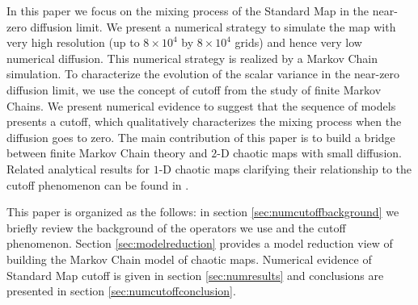   

In this paper we focus on the mixing process of the Standard Map in
the near-zero diffusion limit. We present a numerical strategy to
simulate the map with very high resolution (up to $8 \times 10^4$ by
$8 \times 10^4$ grids) and hence very low numerical diffusion. This
numerical strategy is realized by a Markov Chain simulation. To
characterize the evolution of the scalar variance in the near-zero
diffusion limit, we use the concept of cutoff from the study of finite
Markov Chains. We present numerical evidence to suggest that the
sequence of models presents a cutoff, which qualitatively
characterizes the mixing process when the diffusion goes to zero. The
main contribution of this paper is to build a bridge between finite
Markov Chain theory and $2$-D chaotic maps with small
diffusion. Related analytical results for $1$-D chaotic maps
clarifying their relationship to the cutoff phenomenon can be found in
\cite{symdyn}.

This paper is organized as the follows: in section
\ref{sec:numcutoffbackground} we briefly review the background of the
operators we use and the cutoff phenomenon. Section
\ref{sec:modelreduction} provides a model reduction view of building
the Markov Chain model of chaotic maps. Numerical
evidence of Standard Map cutoff is given in section
\ref{sec:numresults} and conclusions are presented in section
\ref{sec:numcutoffconclusion}.
